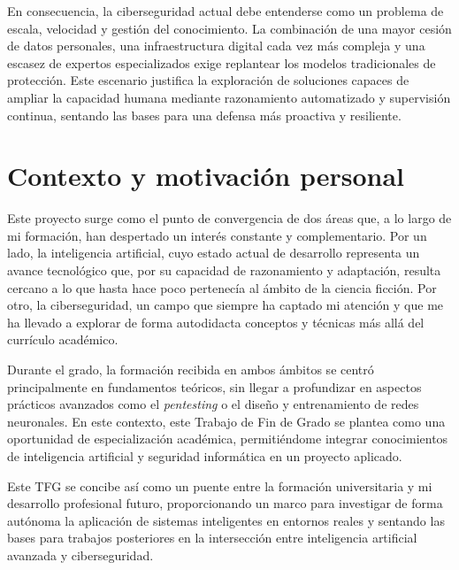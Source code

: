 En consecuencia, la ciberseguridad actual debe entenderse como un problema de escala, velocidad y gestión del conocimiento. La combinación de una mayor cesión de datos personales, una infraestructura digital cada vez más compleja y una escasez de expertos especializados exige replantear los modelos tradicionales de protección. Este escenario justifica la exploración de soluciones capaces de ampliar la capacidad humana mediante razonamiento automatizado y supervisión continua, sentando las bases para una defensa más proactiva y resiliente.

\section{Contexto y motivación personal}
Este proyecto surge como el punto de convergencia de dos áreas que, a lo largo de mi formación, han despertado un interés constante y complementario. Por un lado, la inteligencia artificial, cuyo estado actual de desarrollo representa un avance tecnológico que, por su capacidad de razonamiento y adaptación, resulta cercano a lo que hasta hace poco pertenecía al ámbito de la ciencia ficción. Por otro, la ciberseguridad, un campo que siempre ha captado mi atención y que me ha llevado a explorar de forma autodidacta conceptos y técnicas más allá del currículo académico.

Durante el grado, la formación recibida en ambos ámbitos se centró principalmente en fundamentos teóricos, sin llegar a profundizar en aspectos prácticos avanzados como el \textit{pentesting} o el diseño y entrenamiento de redes neuronales. En este contexto, este Trabajo de Fin de Grado se plantea como una oportunidad de especialización académica, permitiéndome integrar conocimientos de inteligencia artificial y seguridad informática en un proyecto aplicado.

Este TFG se concibe así como un puente entre la formación universitaria y mi desarrollo profesional futuro, proporcionando un marco para investigar de forma autónoma la aplicación de sistemas inteligentes en entornos reales y sentando las bases para trabajos posteriores en la intersección entre inteligencia artificial avanzada y ciberseguridad.
